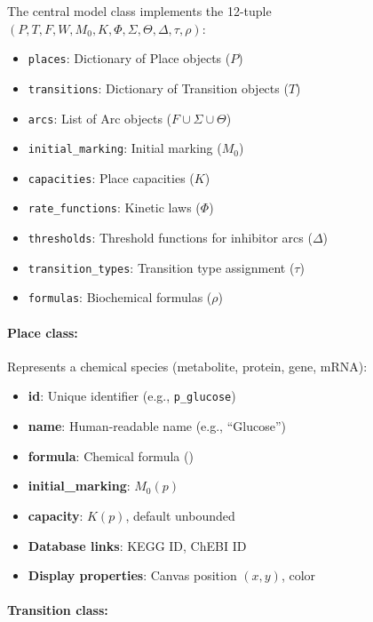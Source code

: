 The central model class implements the 12-tuple $(P, T, F, W, M_0, K, \Phi, \Sigma, \Theta, \Delta, \tau, \rho)$:

\begin{itemize}
    \item \texttt{places}: Dictionary of Place objects ($P$)
    \item \texttt{transitions}: Dictionary of Transition objects ($T$)
    \item \texttt{arcs}: List of Arc objects ($F \cup \Sigma \cup \Theta$)
    \item \texttt{initial\_marking}: Initial marking ($M_0$)
    \item \texttt{capacities}: Place capacities ($K$)
    \item \texttt{rate\_functions}: Kinetic laws ($\Phi$)
    \item \texttt{thresholds}: Threshold functions for inhibitor arcs ($\Delta$)
    \item \texttt{transition\_types}: Transition type assignment ($\tau$)
    \item \texttt{formulas}: Biochemical formulas ($\rho$)
\end{itemize}

\paragraph{Place class:}

Represents a chemical species (metabolite, protein, gene, mRNA):

\begin{itemize}
    \item \textbf{id}: Unique identifier (e.g., \texttt{p\_glucose})
    \item \textbf{name}: Human-readable name (e.g., ``Glucose'')
    \item \textbf{formula}: Chemical formula ()
    \item \textbf{initial\_marking}: $M_0(p)$
    \item \textbf{capacity}: $K(p)$, default unbounded
    \item \textbf{Database links}: KEGG ID, ChEBI ID
    \item \textbf{Display properties}: Canvas position $(x, y)$, color
\end{itemize}

\paragraph{Transition class:}

